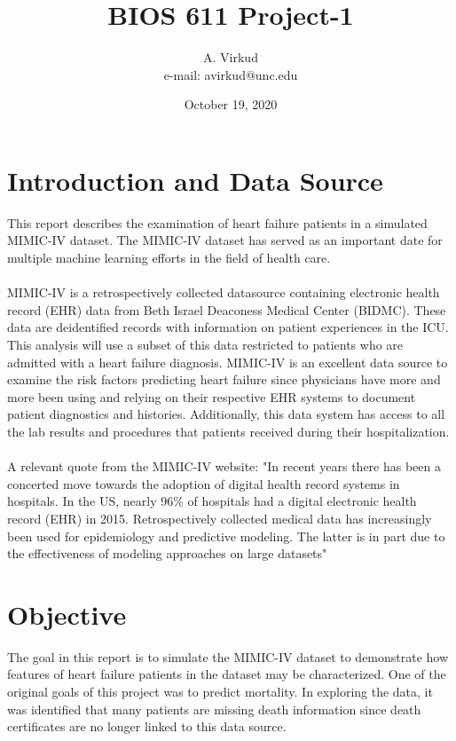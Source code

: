 \documentclass{article}
\begin{document}
\title{BIOS 611 Project-1}
\author{A. Virkud \\ e-mail: avirkud@unc.edu}
\date{October 19, 2020}
\maketitle
\section{Introduction and Data Source}
This report describes the examination of heart failure patients in a simulated MIMIC-IV dataset. The MIMIC-IV dataset has served as an important date for multiple machine learning efforts in the field of health care.\\
\\
MIMIC-IV is a retrospectively collected datasource containing electronic health record (EHR) data from Beth Israel Deaconess Medical Center (BIDMC). These data are deidentified records with information on patient experiences in the ICU. This analysis will use a subset of this data restricted to patients who are admitted with a heart failure diagnosis. MIMIC-IV is an excellent data source to examine the risk factors predicting heart failure since physicians have more and more been using and relying on their respective EHR systems to document patient diagnostics and histories. Additionally, this data system has access to all the lab results and procedures that patients received during their hospitalization.\\
\\
A relevant quote from the MIMIC-IV website: "In recent years there has been a concerted move towards the adoption of digital health record systems in hospitals. In the US, nearly 96\% of hospitals had a digital electronic health record (EHR) in 2015. Retrospectively collected medical data has increasingly been used for epidemiology and predictive modeling. The latter is in part due to the effectiveness of modeling approaches on large datasets"
\section{Objective}
The goal in this report is to simulate the MIMIC-IV dataset to demonstrate how features of heart failure patients in the dataset may be characterized. One of the original goals of this project was to predict mortality. In exploring the data, it was identified that many patients are missing death information since death certificates are no longer linked to this data source. 
\end{document}
